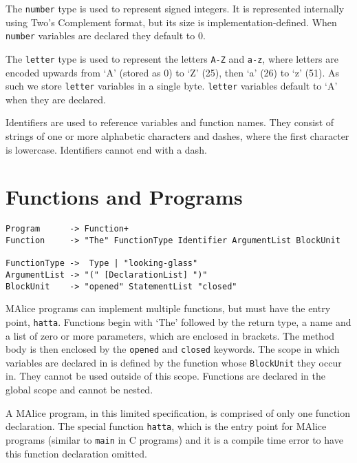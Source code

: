 \documentclass[a4wide, 11pt]{article}
\begin{document}
The \texttt{number} type is used to represent signed integers. It is represented internally using Two's Complement format, but its size is implementation-defined. When \texttt{number} variables are declared they default to 0.

The \texttt{letter} type is used to represent the letters \texttt{A-Z} and \texttt{a-z}, where letters are encoded upwards from `A' (stored as 0) to `Z' (25), then `a' (26) to `z' (51). As such we store \texttt{letter} variables in a single byte. \texttt{letter} variables default to `A' when they are declared.

Identifiers are used to reference variables and function names. They consist of strings of one or more alphabetic characters and dashes, where the first character is lowercase. Identifiers cannot end with a dash.

\section{Functions and Programs}

\begin{verbatim}
Program      -> Function+
Function     -> "The" FunctionType Identifier ArgumentList BlockUnit

FunctionType ->  Type | "looking-glass"
ArgumentList -> "(" [DeclarationList] ")"
BlockUnit    -> "opened" StatementList "closed"
\end{verbatim}

MAlice programs can implement multiple functions, but must have the entry point, \texttt{hatta}. Functions begin with `The' followed by the return type, a name and a list of zero or more parameters, which are enclosed in brackets. The method body is then enclosed by the \texttt{opened} and \texttt{closed} keywords. The scope in which variables are declared in is defined by the function whose \texttt{BlockUnit} they occur in. They cannot be used outside of this scope. Functions are declared in the global scope and cannot be nested. 




A MAlice program, in this limited specification, is comprised of only one function declaration. The special function \texttt{hatta}, which  is the entry point for MAlice programs (similar to \texttt{main} in C programs) and it is a compile time error to have this function declaration omitted.
\end{document}

